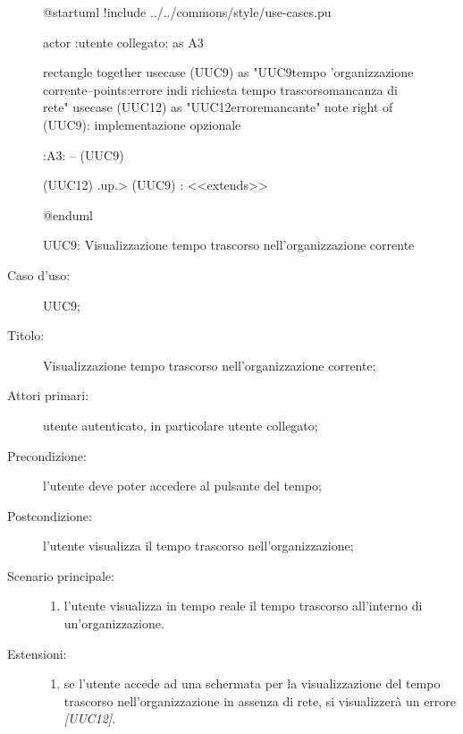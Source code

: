 \documentclass[../../../analisi-dei-requisiti.tex]{subfiles}
\begin{document}
\begin{figure}[H]
  \centering
  \begin{plantuml}
  @startuml
  !include ../../commons/style/use-cases.pu

  actor :utente collegato: as A3


  rectangle {
    together {
      usecase (UUC9) as "UUC9\nVisualizzazione tempo \nnell'organizzazione corrente\n--\nExtension points:\nVisualizzazione errore in\ncaso di richiesta tempo trascorso\nin mancanza di rete"
      usecase (UUC12) as "UUC12\nVisualizzazione errore\nrete mancante"
      note right of (UUC9): implementazione opzionale
    }
  }

  :A3: -- (UUC9)

  (UUC12) .up.> (UUC9) : <<extends>>

  @enduml
  \end{plantuml}
  \caption{UUC9: Visualizzazione tempo trascorso nell'organizzazione corrente}%
  \label{fig:UUC9}
\end{figure}

\begin{description}
  \item[Caso d’uso:] UUC9;
  \item[Titolo:] Visualizzazione tempo trascorso nell'organizzazione corrente;
  \item[Attori primari:] utente autenticato, in particolare utente collegato;
  \item[Precondizione:] l'utente deve poter accedere al pulsante del tempo;
  \item[Postcondizione:] l'utente visualizza il tempo trascorso nell'organizzazione;
  \item[Scenario principale:]
        \begin{enumerate}
          \item l'utente visualizza in tempo reale il tempo trascorso all'interno di un'organizzazione.
        \end{enumerate}
  \item[Estensioni:]
        \begin{enumerate}
          \item se l'utente accede ad una schermata per la visualizzazione del tempo trascorso nell'organizzazione in assenza di rete, si visualizzerà un errore \emph{[UUC12]}.
        \end{enumerate}
\end{description}
\end{document}
